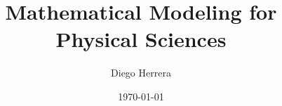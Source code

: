 \author[DH]{Diego Herrera}
\title[Modeling]{Mathematical Modeling for Physical Sciences}
\date{\today}

\makeatletter
{}
\makeatother

\renewcommand{\PrelimWords}{[Modeling -- DH -- v. 1.0.0]}
